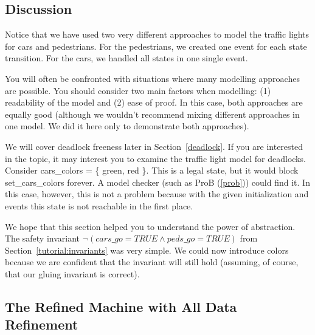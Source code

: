 
\subsection{Discussion}

Notice that we have used two very different approaches to model the traffic lights for cars and pedestrians.  For the pedestrians, we created one event for each state transition.  For the cars, we handled all states in one single event.

You will often be confronted with situations where many modelling approaches are possible.  You should consider two main factors when modelling: (1) readability of the model and (2) ease of proof.  In this case, both approaches are equally good (although we wouldn't recommend mixing different approaches in one model. We did it here only to demonstrate both approaches).

We will cover deadlock freeness later in Section~\ref{deadlock}.  If you are interested in the topic, it may interest you to examine the traffic light model for deadlocks.  Consider \textsf{cars\_colors = \{ green, red \}}. This is a legal state, but it would block \textsf{set\_cars\_colors} forever.  A model checker (such as ProB (\ref{prob})) could find it.  In this case, however, this is not a problem because with the given initialization and events this state is not reachable in the first place.

We hope that this section helped you to understand the power of abstraction.  The safety invariant
$\lnot(cars\_go = TRUE \land peds\_go = TRUE)$ from Section~\ref{tutorial:invariants} was very simple.  We could now introduce colors because we are confident that the invariant will still hold (assuming, of course, that our gluing invariant is correct).

\subsection{The Refined Machine with All Data Refinement}

